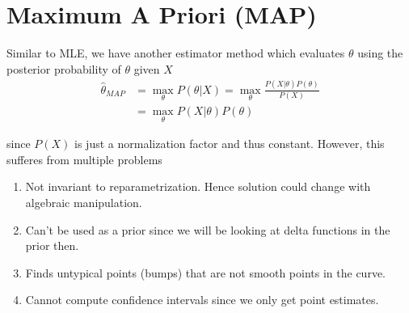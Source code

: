 \documentclass[../../statistical_learning_notes.tex]{subfiles}
\begin{document}
\section{Maximum A Priori (MAP)}
Similar to MLE, we have another estimator method which evaluates $\theta$ using the posterior probability of $\theta$ given $X$
\begin{align*}
    \hat{\theta}_{MAP} &= \max_{\theta} P(\theta|X) = \max_{\theta} \frac{P(X|\theta)P(\theta)}{P(X)}\\
    &= \max_{\theta}P(X|\theta)P(\theta)
\end{align*}

since $P(X)$ is just a normalization factor and thus constant. However, this sufferes from multiple problems
\begin{enumerate}
    \item Not invariant to reparametrization. Hence solution could change with algebraic manipulation.
    \item Can't be used as a prior since we will be looking at delta functions in the prior then.
    \item Finds untypical points (bumps) that are not smooth points in the curve.
    \item Cannot compute confidence intervals since we only get point estimates.
\end{enumerate}
\end{document}
